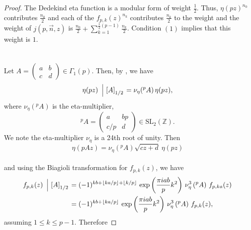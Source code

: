 \documentclass[12pt]{amsart}
\theoremstyle{definition}
\theoremstyle{remark}
\numberwithin{equation}{section}
\newcommand{\SL}{\mbox{SL}}
\newcommand\Lpar[1]{\left(#1\right)}
\newcommand\FL[1]{\left\lfloor#1\right\rfloor}
\newcommand\stroke[3]{#1\,\left\arrowvert\,\left[#2\right]_{#3}\right.}
\begin{document}
\begin{proof}
The Dedekind eta function is a modular form of weight $\frac{1}{2}$. Thus, $\eta(pz)^{n_0}$ contributes $\frac{n_0}{2}$ and each of the $f_{p,k}(z)^{n_k}$ contributes $\frac{n_k}{2}$ to the weight and the weight of $j(p,\overrightarrow{n},z)$ is $ \frac{n_0}{2}+\sum\limits_{k=1}^{\frac{1}{2}(p-1)}\frac{n_k}{2}$. Condition $(1)$ implies that this weight is $1$.
\\\\\\
Let $A=\begin{pmatrix} a & b \\ c & d\end{pmatrix} \in \Gamma_1(p)$. Then, by \cite[Theorem 6.14, p.243]{Ga19a}, we have
\\
$$
\eta(pz)\stroke{}{A}{1/2}= \nu_\eta({}^{p}A)\, \eta(pz),
$$
where $\nu_\eta({}^{p}A)$ is the eta-multiplier, 
$$
{}^pA = \begin{pmatrix} a & bp \\ c/p & d \end{pmatrix} \in \SL_2(\mathbb{Z}).
$$ 
We note the eta-multiplier $\nu_\eta$ is a 24th root of unity.
Then $$\eta(pAz)=\nu_\eta({}^{p}A)\sqrt{cz+d}~\eta(pz)$$ 
\\
and using the Biagioli transformation \cite[Theorem 6.12, p.243]{Ga19a} for $f_{p,k}(z)$, we have
\begin{align*}
f_{p,k}(z)\stroke{}{A}{1/2}&=(-1)^{k b + \FL{k a/p} + \FL{k/p}}\, \exp\Lpar{\frac{\pi iab}{p}k^2} \,\nu_{\eta}^3\Lpar{{}^pA}\, f_{p,k a}(z)
\\
&=(-1)^{k b + \FL{k a/p}}\, \exp\Lpar{\frac{\pi iab}{p}k^2} \,\nu_{\eta}^3\Lpar{{}^pA}\, f_{p,k}(z),
\end{align*}
assuming $1 \leq k \leq p-1$. Therefore


\end{proof}
\end{document}
